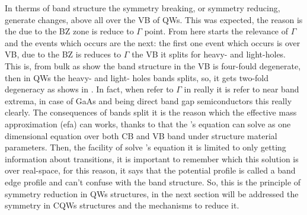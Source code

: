 In therms of band structure the symmetry breaking, or symmetry reducing, generate changes, above all over the VB of \gls{QW}s. This was expected, the reason is the due to the \gls{BZ} zone is reduce to $\Gamma$ point. From here starts the relevance of $\Gamma$ and the events which occurs are the next: the first one event which occurs is over VB, due to the \gls{BZ} is reduces to  $\Gamma$ the \gls{VB} it splits for heavy- and light-holes. This is, from bulk as show the band structure in  the \gls{VB} is four-fould degenerate, then in QWs the heavy- and light- holes bands splits, so,  it gets two-fold degeneracy as shows in . In fact, when refer to $\Gamma$ in really it is refer to near band extrema, in case of GaAs and \algaas  being direct band gap semiconductors this really clearly. The consequences of bands split it is the reason which the effective mass approximation (\gls{efa}) can works, thanks to that the  \sch's equation can solve as one dimensional equation over both \gls{CB} and \gls{VB} band  under structure material parameters. 
Then, the facility of solve \sch's equation it is limited to only getting information about transitions, it is important to remember which this solution is over real-space, for this reason, it says that the potential profile is called a band edge profile and can't confuse with the band structure. So, this is the principle of symmetry reduction in \gls{QW}s structures, in the next section will be addressed the symmetry in \gls{CQWs} structures and the mechanisms to reduce it. 


	


